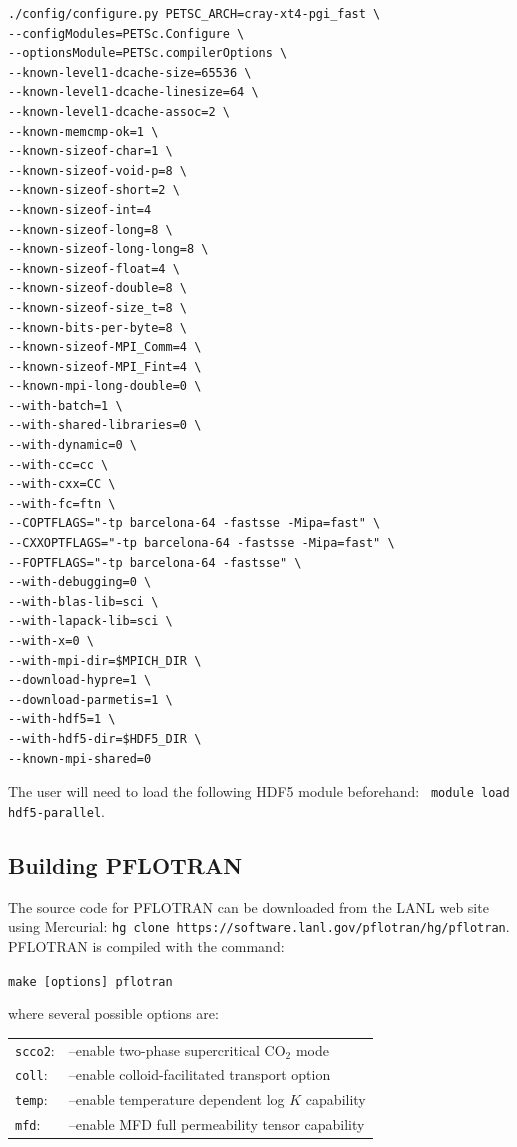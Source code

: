 \documentclass[12pt]{article}
\begin{document}
\footnotesize
\begin{verbatim}
./config/configure.py PETSC_ARCH=cray-xt4-pgi_fast \
--configModules=PETSc.Configure \
--optionsModule=PETSc.compilerOptions \
--known-level1-dcache-size=65536 \
--known-level1-dcache-linesize=64 \
--known-level1-dcache-assoc=2 \
--known-memcmp-ok=1 \
--known-sizeof-char=1 \
--known-sizeof-void-p=8 \
--known-sizeof-short=2 \
--known-sizeof-int=4
--known-sizeof-long=8 \
--known-sizeof-long-long=8 \
--known-sizeof-float=4 \
--known-sizeof-double=8 \
--known-sizeof-size_t=8 \
--known-bits-per-byte=8 \
--known-sizeof-MPI_Comm=4 \
--known-sizeof-MPI_Fint=4 \
--known-mpi-long-double=0 \
--with-batch=1 \
--with-shared-libraries=0 \
--with-dynamic=0 \
--with-cc=cc \
--with-cxx=CC \
--with-fc=ftn \
--COPTFLAGS="-tp barcelona-64 -fastsse -Mipa=fast" \
--CXXOPTFLAGS="-tp barcelona-64 -fastsse -Mipa=fast" \
--FOPTFLAGS="-tp barcelona-64 -fastsse" \
--with-debugging=0 \
--with-blas-lib=sci \
--with-lapack-lib=sci \
--with-x=0 \
--with-mpi-dir=$MPICH_DIR \
--download-hypre=1 \
--download-parmetis=1 \
--with-hdf5=1 \
--with-hdf5-dir=$HDF5_DIR \
--known-mpi-shared=0
\end{verbatim}
\normalsize
The user will need to load the following HDF5 module beforehand: \ \verb|module load hdf5-parallel|.

\subsection{Building PFLOTRAN}

The source code for PFLOTRAN can be downloaded from the LANL web site using Mercurial: \verb|hg clone https://software.lanl.gov/pflotran/hg/pflotran|. PFLOTRAN is compiled with the command:

\verb|make [options] pflotran|

\noindent
where several possible options are: 

\begin{tabular}{ll}
\verb|scco2|: & --enable two-phase supercritical CO$_2$ mode\\
\verb|coll|: & --enable colloid-facilitated transport option\\
\verb|temp|: & --enable temperature dependent log $K$ capability\\
\verb|mfd|: & --enable MFD full permeability tensor capability
\end{tabular}
\end{document}

